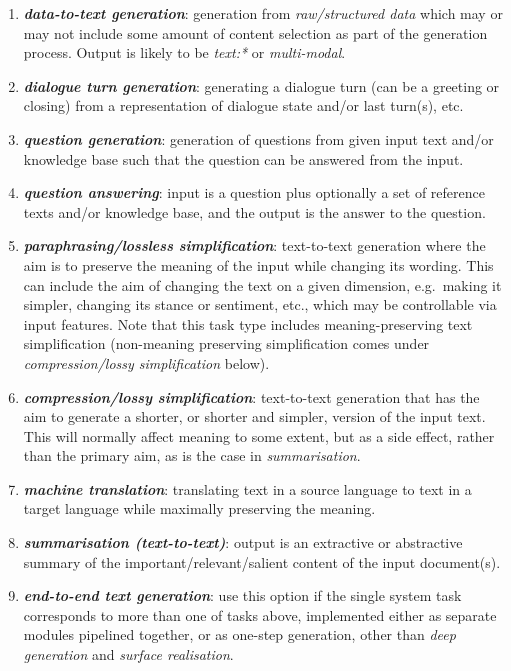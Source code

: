 \documentclass[11pt,a4paper]{article}
\newcommand{\egcvalue}[1]{\textbf{\textit{#1}}}
\begin{document}
\begin{enumerate}[itemsep=0cm,leftmargin=0.5cm,label={\small $\square$}]
    \item \egcvalue{data-to-text generation}: generation from \textit{raw/structured data} which may or may not include some amount of content selection as part of the generation process. Output is likely to be \textit{text:*} or \textit{multi-modal}.
    
    \item \egcvalue{dialogue turn generation}: generating a dialogue turn (can be a greeting or closing) from a representation of dialogue state and/or last turn(s), etc. 

    \item \egcvalue{question generation}: generation of questions from given input text and/or knowledge base such that the question can be answered from the input.
    
    \item \egcvalue{question answering}: input is a question plus optionally a set of reference texts and/or knowledge base, and the output is the answer to the question.
    
    \item \egcvalue{paraphrasing/lossless simplification}: text-to-text generation where the aim is to preserve the meaning of the input while changing its wording. This can include the aim of changing the text on a given dimension, e.g.\ making it simpler, changing its stance or sentiment, etc., which may be controllable via input features. Note that this task type includes meaning-preserving text simplification (non-meaning preserving simplification comes under \textit{compression/lossy simplification} below).
    
    \item \egcvalue{compression/lossy simplification}: text-to-text generation that has the aim to generate a shorter, or shorter and simpler, version of the input text. This will normally affect meaning to some extent, but as a side effect, rather than the primary aim, as is the case in \textit{summarisation}.
    
    \item \egcvalue{machine translation}: translating text in a source language to text in a target language while maximally preserving the meaning. 
    
    \item \egcvalue{summarisation (text-to-text)}: output is an extractive or abstractive summary of the important/relevant/salient content of the input  document(s).

    \item \egcvalue{end-to-end text generation}: use this option if the single system task corresponds to more than one of tasks above, implemented either as separate modules pipelined together, or as one-step generation, other than \textit{deep generation} and \textit{surface realisation}.
    

\end{enumerate}
\end{document}
